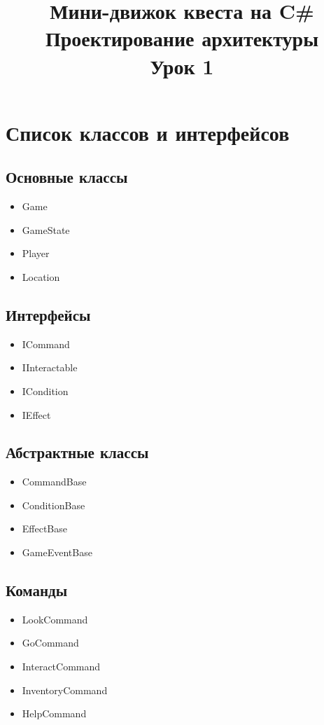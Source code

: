 \documentclass[a4paper,12pt]{article}
\title{Мини-движок квеста на C\# \\ Проектирование архитектуры \\ Урок 1}
\author{}
\date{}
\begin{document}
\maketitle

\section{Список классов и интерфейсов}

\subsection{Основные классы}
\begin{itemize}
\item Game
\item GameState
\item Player
\item Location
\end{itemize}

\subsection{Интерфейсы}
\begin{itemize}
\item ICommand
\item IInteractable
\item ICondition
\item IEffect
\end{itemize}

\subsection{Абстрактные классы}
\begin{itemize}
\item CommandBase
\item ConditionBase
\item EffectBase
\item GameEventBase
\end{itemize}

\subsection{Команды}
\begin{itemize}
\item LookCommand
\item GoCommand
\item InteractCommand
\item InventoryCommand
\item HelpCommand
\end{itemize}
\end{document}
